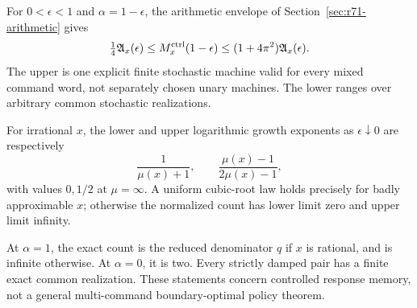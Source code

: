 \begin{theorem}\label{thm:r72-control-envelope}
For $0<\epsilon<1$ and $\alpha=1-\epsilon$, the arithmetic envelope of Section~\ref{sec:r71-arithmetic} gives
\begin{equation}\label{eq:r72-control-envelope}
 \tfrac14\mathfrak A_x(\epsilon)
 \le M_x^{\rm ctrl}(1-\epsilon)
 \le(1+4\pi^2)\mathfrak A_x(\epsilon).
\end{equation}
The upper is one explicit finite stochastic machine valid for every mixed command word, not separately chosen unary machines. The lower ranges over arbitrary common stochastic realizations.

For irrational $x$, the lower and upper logarithmic growth exponents as $\epsilon\downarrow0$ are respectively
\[
 \frac1{\mu(x)+1},\qquad\frac{\mu(x)-1}{2\mu(x)-1},
\]
with values $0,1/2$ at $\mu=\infty$. A uniform cubic-root law holds precisely for badly approximable $x$; otherwise the normalized count has lower limit zero and upper limit infinity.

At $\alpha=1$, the exact count is the reduced denominator $q$ if $x$ is rational, and is infinite otherwise. At $\alpha=0$, it is two. Every strictly damped pair has a finite exact common realization. These statements concern controlled response memory, not a general multi-command boundary-optimal policy theorem.
\end{theorem}
